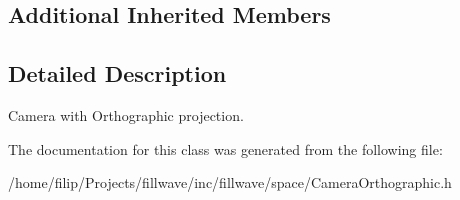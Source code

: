 \subsection*{Additional Inherited Members}


\subsection{Detailed Description}
Camera with Orthographic projection. 

The documentation for this class was generated from the following file\+:\begin{DoxyCompactItemize}
\item 
/home/filip/\+Projects/fillwave/inc/fillwave/space/Camera\+Orthographic.\+h\end{DoxyCompactItemize}
